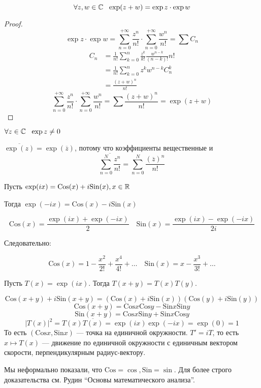 

\cfoot{}



\begin{theorem}
    \[\forall z, w\in \mathbb{C} \ \ \exp(z + w) = \exp z \cdot \exp w\]
\end{theorem}
\begin{proof}
    \[\exp z \cdot \exp w = \sum_{n = 0}^{ +\infty} \frac{z^n}{n!} \cdot \sum_{n = 0}^{ +\infty} \frac{w^n}{n!} = \sum C_n\]
    \begin{align*}
        C_n & = \frac{1}{n!}\sum_{k = 0}^n \frac{z^k}{k!} \frac{w^{n - k}}{(n - k)!} n! \\
            & = \frac{1}{n!} \sum_{k = 0}^n z^k w^{n - k} C_n^k                         \\
            & = \frac{(z + w)^n}{n!}
    \end{align*}
    \[\sum_{n = 0}^{ +\infty} \frac{z^n}{n!} \cdot \sum_{n = 0}^{ +\infty} \frac{w^n}{n!} = \sum \frac{(z + w)^n}{n!} = \exp(z + w)\]
\end{proof}

\begin{corollary}
    \(\forall z\in \mathbb{C}\ \ \exp z \neq 0\)
\end{corollary}

\(\overline{\exp(z)} = \exp(\overline z)\), потому что коэффициенты вещественные и
\[\overline{\sum_{n = 0}^N \frac{z^n}{n!}} = \sum_{n = 0}^N \frac{(\overline z)^n}{n!}\]

\begin{remark}
    Пусть \(\exp(ix) = \text{Cos}(x) + i\text{Sin}(x), x\in\mathbb{R}\)

    Тогда \(\exp( - ix) = \text{Cos}(x) - i\text{Sin}(x)\)

    \[\text{Cos}(x) = \frac{\exp(ix) + \exp( - ix)}{2} \quad \text{Sin}(x) = \frac{\exp(ix) - \exp(-ix)}{2i}\]

    Следовательно:

    \[\text{Cos}(x) = 1 - \frac{x^2}{2!} + \frac{x^4}{4!} + \dots \quad \text{Sin}(x) = x - \frac{x^3}{3!} + \dots \]

    Пусть \(T(x) = \exp(ix)\). Тогда \(T(x + y) = T(x) T(y)\).

    \[\text{Cos}(x + y) + i\text{Sin}(x + y) = (\text{Cos}(x) + i\text{Sin}(x))(\text{Cos}(y) + i\text{Sin}(y))\]
    \[\text{Cos}(x + y) = \text{Cos} x \text{Cos} y - \text{Sin} x \text{Sin} y\]
    \[\text{Sin}(x + y) = \text{Cos} x \text{Sin} y + \text{Sin} x \text{Cos} y\]
    \[|T(x)|^2 = T(x) \overline{T(x)} = \exp(ix) \exp( - ix) = \exp(0) = 1\]
    То есть \((\text{Cos} x, \text{Sin} x)\) --- точка на единичной окружности.
    \(T' = iT\), то есть \(x \mapsto T(x)\) --- движение по единичной окружности с единичным вектором скорости, перпендикулярным радиус-вектору.

    Мы неформально показали, что \(\text{Cos} = \cos, \text{Sin} = \sin\). Для более строго доказательства см. Рудин ``Основы математического анализа''.
\end{remark}

